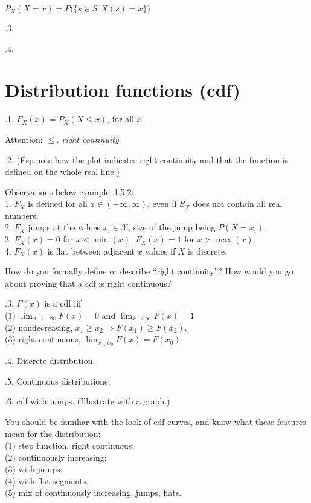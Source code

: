 \documentclass[12pt]{article}
\begin{document}
$P_X(X = x) = P\bigl(\{s \in S: X(s) = x\}\bigr)$

.3.

.4.

\section{Distribution functions (cdf)}

.1. $F_X(x) = P_X(X \le x)$, for all $x$.

Attention: $\le$. \emph{right continuity}.

.2.
(Esp.\@ note how the plot indicates right continuity
and that the function is defined on the whole real line.)

Observations below example~1.5.2:\\
1. $F_X$ is defined for all $x \in (-\infty, \infty)$,
    even if $S_X$ does not contain all real numbers.\\
2. $F_X$ jumps at the values $x_i \in \mathcal{X}$,
size of the jump being $P(X = x_i)$.\\
3. $F_X(x) = 0$ for $x < \operatorname{min}(x)$,
    $F_X(x) = 1$ for $x > \operatorname{max}(x)$.\\
4. $F_X(x)$ is flat between adjacent $x$ values if $X$ is
discrete.

\exercise
How do you formally define or describe
``right continuity''?
How would you go about proving that
a cdf is right continuous?

.3.  $F(x)$ is a cdf iif\\
(1) $\lim_{x\to -\infty} F(x) = 0$ and
    $\lim_{x\to \infty} F(x) = 1$\\
(2) nondecreasing, \ie $x_1 \ge x_2 \Rightarrow F(x_1) \ge F(x_2)$.\\
(3) right continuous, \ie $\lim_{x \downarrow x_0} F(x) = F(x_0)$.

.4. Discrete distribution.

.5. Continuous distributions.

.6. cdf with jumps. (Illustrate with a graph.)

You should be familiar with the look of cdf curves,
and know what these features mean for the distribution:\\
(1) step function, right continuous;\\
(2) continuously increasing;\\
(3) with jumps;\\
(4) with flat segments.\\
(5) mix of continuously increasing, jumps, flats.
\end{document}
